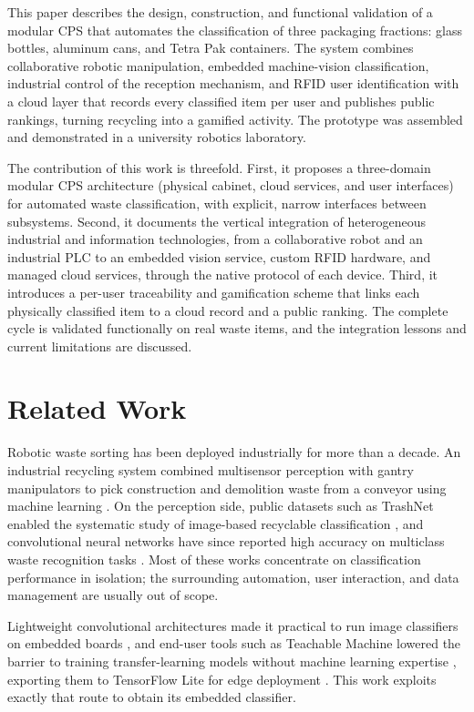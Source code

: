 \documentclass[conference]{IEEEtran}
\begin{document}
This paper describes the design, construction, and functional validation of a modular CPS that automates the classification of three packaging fractions: glass bottles, aluminum cans, and Tetra Pak containers. The system combines collaborative robotic manipulation, embedded machine-vision classification, industrial control of the reception mechanism, and RFID user identification with a cloud layer that records every classified item per user and publishes public rankings, turning recycling into a gamified activity. The prototype was assembled and demonstrated in a university robotics laboratory.

The contribution of this work is threefold. First, it proposes a three-domain modular CPS architecture (physical cabinet, cloud services, and user interfaces) for automated waste classification, with explicit, narrow interfaces between subsystems. Second, it documents the vertical integration of heterogeneous industrial and information technologies, from a collaborative robot and an industrial PLC to an embedded vision service, custom RFID hardware, and managed cloud services, through the native protocol of each device. Third, it introduces a per-user traceability and gamification scheme that links each physically classified item to a cloud record and a public ranking. The complete cycle is validated functionally on real waste items, and the integration lessons and current limitations are discussed.

\section{Related Work}
Robotic waste sorting has been deployed industrially for more than a decade. An industrial recycling system combined multisensor perception with gantry manipulators to pick construction and demolition waste from a conveyor using machine learning \cite{b4}. On the perception side, public datasets such as TrashNet enabled the systematic study of image-based recyclable classification \cite{b5}, and convolutional neural networks have since reported high accuracy on multiclass waste recognition tasks \cite{b6}. Most of these works concentrate on classification performance in isolation; the surrounding automation, user interaction, and data management are usually out of scope.

Lightweight convolutional architectures made it practical to run image classifiers on embedded boards \cite{b7}, and end-user tools such as Teachable Machine lowered the barrier to training transfer-learning models without machine learning expertise \cite{b8}, exporting them to TensorFlow Lite for edge deployment \cite{b9}. This work exploits exactly that route to obtain its embedded classifier.
\end{document}
